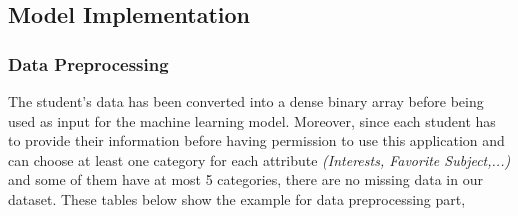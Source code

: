 \documentclass{article}
\begin{document}
\pagebreak

\subsection{Model Implementation}
\subsubsection{Data Preprocessing}
The student's data has been converted into a dense binary array before being used as input for the machine learning model. Moreover, since each student has to provide their information before having permission to use this application and can choose at least one category for each attribute \emph{(Interests, Favorite Subject,...)} and some of them have at most 5 categories, there are no missing data in our dataset. These tables below show the example for data preprocessing part,

\begin{table}[H]
\caption{Data before preprocessing}
\label{data preprocessing}
\end{table}

\begin{table}[H]
\centering
{}
\caption{Data after preprocessing}
\label{data preprocessing}
\end{table}
\end{document}
